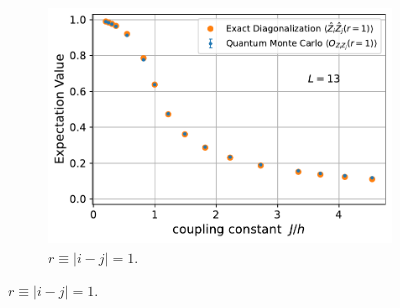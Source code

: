 \documentclass[../thesis_main.tex]{subfiles}
\begin{document}
\begin{figure}[!htb]
    \centering
    \begin{subfigure}[b]{0.5\textwidth}  %
        \centering
        \includegraphics[width=\textwidth]{images/13_site/L=13_ZZ(r=1).pdf}
        \caption{$r \equiv |i-j| = 1$.}
    \end{subfigure}
\end{figure}
    \vspace*{1em}
\end{document}
